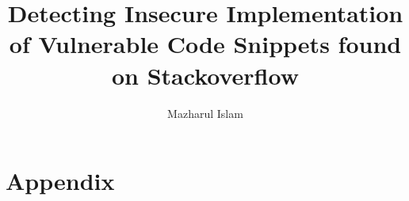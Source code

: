 \documentclass[sigconf]{acmart}
\begin{document}
\title{Detecting Insecure Implementation of Vulnerable Code Snippets found on Stackoverflow}
\author{Mazharul Islam}
  
\maketitle



      







  
\section{Appendix}

\end{document}
